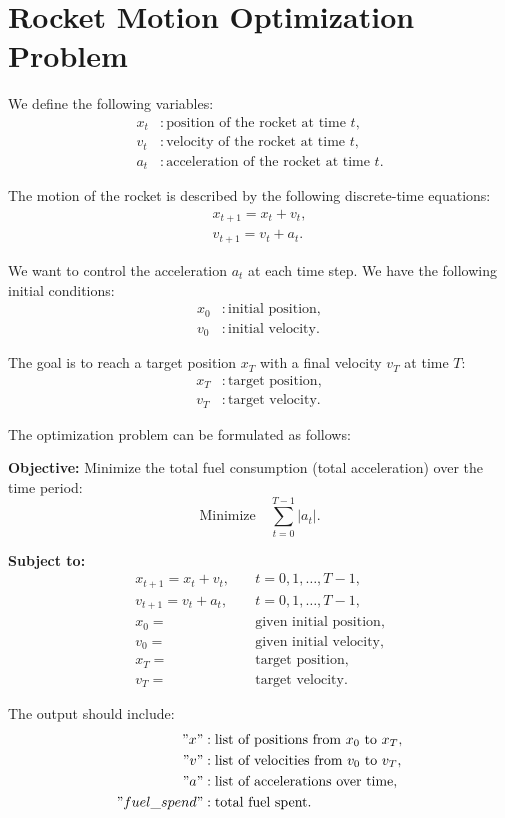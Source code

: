 \documentclass{article}
\begin{document}
\section*{Rocket Motion Optimization Problem}

We define the following variables:
\begin{align*}
    x_t & : \text{position of the rocket at time } t, \\
    v_t & : \text{velocity of the rocket at time } t, \\
    a_t & : \text{acceleration of the rocket at time } t.
\end{align*}

The motion of the rocket is described by the following discrete-time equations:
\begin{align}
    x_{t+1} = x_t + v_t, \\
    v_{t+1} = v_t + a_t.
\end{align}

We want to control the acceleration \( a_t \) at each time step. We have the following initial conditions:
\begin{align*}
    x_0 & : \text{initial position}, \\
    v_0 & : \text{initial velocity}.
\end{align*}

The goal is to reach a target position \( x_T \) with a final velocity \( v_T \) at time \( T \):
\begin{align*}
    x_T & : \text{target position}, \\
    v_T & : \text{target velocity}.
\end{align*}

The optimization problem can be formulated as follows:

\textbf{Objective:}
Minimize the total fuel consumption (total acceleration) over the time period:
\begin{equation}
    \text{Minimize} \quad \sum_{t=0}^{T-1} |a_t|.
\end{equation}

\textbf{Subject to:}
\begin{align}
    x_{t+1} = x_t + v_t, \quad & t = 0, 1, \ldots, T-1, \\
    v_{t+1} = v_t + a_t, \quad & t = 0, 1, \ldots, T-1, \\
    x_0 = & \text{given initial position}, \\
    v_0 = & \text{given initial velocity}, \\
    x_T = & \text{target position}, \\
    v_T = & \text{target velocity}.
\end{align}

The output should include:
\begin{align*}
    "x" & : \text{list of positions from } x_0 \text{ to } x_T, \\
    "v" & : \text{list of velocities from } v_0 \text{ to } v_T, \\
    "a" & : \text{list of accelerations over time,} \\
    "fuel\_spend" & : \text{total fuel spent}.
\end{align*}
\end{document}
